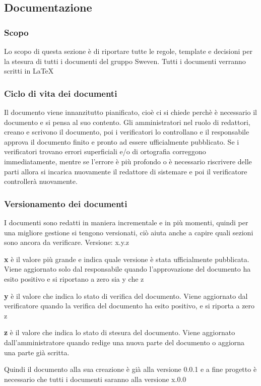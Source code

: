 \subsection{Documentazione}
\subsubsection{Scopo}
Lo scopo di questa sezione è di riportare tutte le regole, template e decisioni 
per la stesura di tutti i documenti del gruppo Sweven. \newline
Tutti i documenti verranno scritti in \LaTeX

\subsubsection{Ciclo di vita dei documenti}
Il documento viene innanzitutto pianificato, cioè ci si chiede perchè è necessario il documento
e si pensa al suo contento. Gli amministratori nel ruolo di redattori, creano e scrivono 
il documento, poi i verificatori lo controllano e il responsabile approva il documento 
finito e pronto ad essere ufficialmente pubblicato. \newline
Se i verificatori trovano errori superficiali e/o di ortografia correggono immediatamente,
mentre se l'errore è più profondo o è necessario riscrivere delle parti allora si
incarica nuovamente il redattore di sistemare e poi il verificatore controllerà nuovamente.

\subsubsection{Versionamento dei documenti}
I documenti sono redatti in maniera incrementale e in più momenti, quindi per una migliore 
gestione si tengono versionati, ciò aiuta anche a capire quali sezioni sono ancora da verificare.
\newline Versione: x.y.z
\begin{description}
    \item \textbf{x} è il valore più grande e indica quale versione è stata ufficialmente pubblicata.
            Viene aggiornato solo dal responsabile quando l'approvazione del documento ha esito positivo
            e si riportano a zero sia y che z
    \item \textbf{y} è il valore che indica lo stato di verifica del documento. Viene aggiornato dal verificatore 
            quando la verifica del documento ha esito positivo, e si riporta a zero z
    \item \textbf{z} è il valore che indica lo stato di stesura del documento. Viene aggiornato dall'amministratore 
            quando redige una nuova parte del documento o aggiorna una parte già scritta.
\end{description}
Quindi il documento alla sua creazione è già alla versione 0.0.1 e a fine progetto è necessario che 
tutti i documenti saranno alla versione x.0.0


